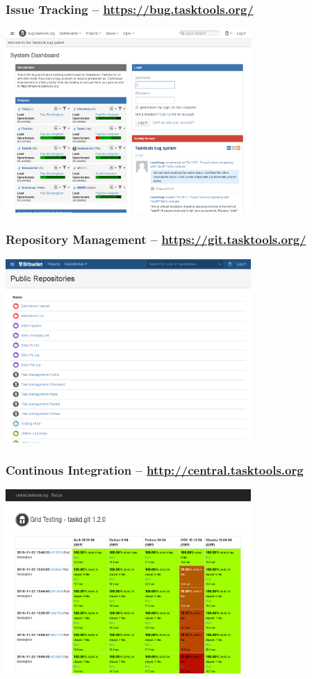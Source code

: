 \documentclass[t,handout,aspectratio=169]{beamer}
\begin{document}
\begin{frame}[fragile]\frametitle{Issue Tracking -- \url{https://bug.tasktools.org/}}
    \begin{center}
        \href{https://bug.tasktools.org/}{\includegraphics[height=7cm]{bug-tasktools-org.png}}
    \end{center}
\end{frame}

\begin{frame}[fragile]\frametitle{Repository Management -- \url{https://git.tasktools.org/}}
    \begin{center}
        \href{https://git.tasktools.org/}{\includegraphics[height=7cm]{git-tasktools-org.png}}
    \end{center}
\end{frame}

\begin{frame}[fragile]\frametitle{Continous Integration -- \url{http://central.tasktools.org}}
    \begin{center}
        \href{http://central.tasktools.org/}{\includegraphics[height=7cm]{central-tasktools-org.png}}
    \end{center}
\end{frame}
\end{document}
